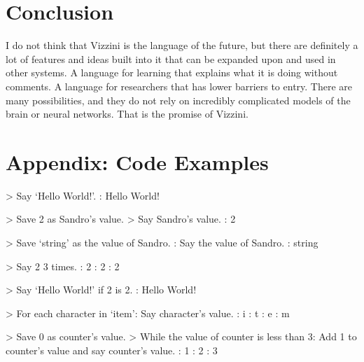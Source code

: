 \documentclass[titlepage]{article}
\newcommand{\langName}{Vizzini}
\begin{document}
\section*{Conclusion}
I do not think that \langName{} is the language of the future, but there are definitely a lot of features and ideas built into it that can be expanded upon and used in other systems. A language for learning that explains what it is doing without comments. A language for researchers that has lower barriers to entry. There are many possibilities, and they do not rely on incredibly complicated models of the brain or neural networks. That is the promise of \langName{}.


\newpage{}



\newpage{}
\section*{Appendix: Code Examples}

\begin{codeblock}[title={Hello World}]
> Say `Hello World!'.
: Hello World!
\end{codeblock}

\begin{codeblock}[title={Saving Variables}]
> Save 2 as Sandro's value.
> Say Sandro's value.
: 2
\end{codeblock}

\begin{codeblock}[title={Alternative Variable Access}]
> Save `string' as the value of Sandro.
: Say the value of Sandro.
: string
\end{codeblock}

\begin{codeblock}[title={In-line Loops}]
> Say 2 3 times.
: 2
: 2
: 2
\end{codeblock}

\begin{codeblock}[title={In-line If Statements}]
> Say `Hello World!' if 2 is 2.
: Hello World!
\end{codeblock}

\begin{codeblock}[title={For Loops}]
> For each character in `item': Say character's value.
: i
: t
: e
: m
\end{codeblock}

\begin{codeblock}[title={While Loops}]
> Save 0 as counter's value.
> While the value of counter is less than 3:
    Add 1 to counter's value and say counter's value.
: 1
: 2
: 3
\end{codeblock}
\end{document}
